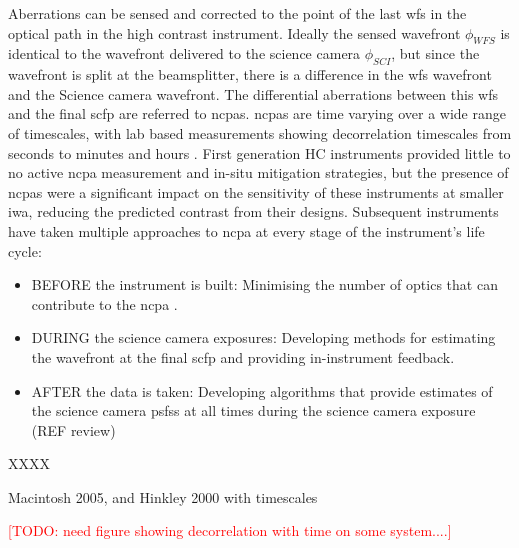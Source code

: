 \documentclass[letterpaper]{ar-1col}
\newcommand{\todo}[1]{\textcolor{red}{[TODO: #1]}}
\begin{document}
Aberrations can be sensed and corrected to the point of the last \ac{wfs} in the optical path in the high contrast instrument.
%
Ideally the sensed wavefront $\phi_{WFS}$ is identical to the wavefront delivered to the science camera $\phi_{SCI}$, but since the wavefront is split at the beamsplitter, there is a difference in the \ac{wfs} wavefront and the Science camera wavefront.
%
The differential aberrations between this \ac{wfs} and the final \ac{scfp} are referred to \acp{ncpa}.
%
\acp{ncpa} are time varying over a wide range of timescales, with lab based measurements showing decorrelation timescales from seconds to minutes and hours \citep{Martinez12,Males21}.
%
First generation HC instruments provided little to no active \ac{ncpa} measurement and in-situ mitigation strategies, but the presence of \acp{ncpa} were a significant impact on the sensitivity of these instruments at smaller \ac{iwa}, reducing the predicted contrast from their designs.
%
Subsequent instruments have taken multiple approaches to \ac{ncpa} at every stage of the instrument's life cycle:

\begin{itemize}
    \item BEFORE the instrument is built: Minimising the number of optics that can contribute to the \ac{ncpa} \citep[by making the optics optomechanically and thermally stable; ][]{Absil24}.
    \item DURING the science camera exposures: Developing methods for estimating the wavefront at the final \ac{scfp} and providing in-instrument feedback.
    
    \item AFTER the data is taken: Developing algorithms that provide estimates of the science camera \acp{psf}s at all times during the science camera exposure (REF review)

\end{itemize}

XXXX

Macintosh 2005, and Hinkley 2000 with timescales

\todo{need figure showing decorrelation with time on some system....}



\end{document}

